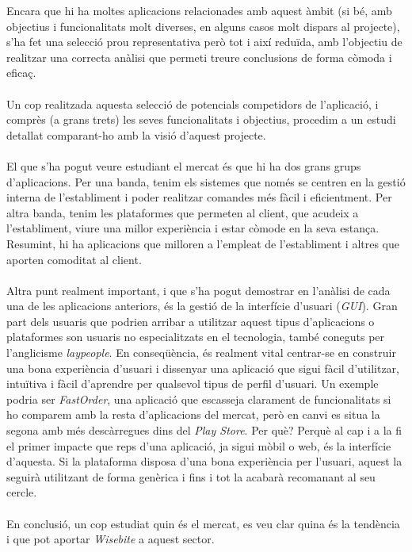 Encara que hi ha moltes aplicacions relacionades amb aquest àmbit (si bé, amb objectius i funcionalitats molt diverses, en alguns casos molt dispars al projecte), s'ha fet una selecció prou representativa però tot i així reduïda, amb l'objectiu de realitzar una correcta anàlisi que permeti treure conclusions de forma còmoda i eficaç.
\\\\
Un cop realitzada aquesta selecció de potencials competidors de l'aplicació, i comprès (a grans trets) les seves funcionalitats i objectius, procedim a un estudi detallat comparant-ho amb la visió d'aquest projecte.
\\\\
El que s'ha pogut veure estudiant el mercat és que hi ha dos grans grups d'aplicacions. Per una banda, tenim els sistemes que només se centren en la gestió interna de l'establiment i poder realitzar comandes més fàcil i eficientment. Per altra banda, tenim les plataformes que permeten al client, que acudeix a l'establiment, viure una millor experiència i estar còmode en la seva estança. Resumint, hi ha aplicacions que milloren a l'empleat de l'establiment i altres que aporten comoditat al client.
\\\\
Altra punt realment important, i que s'ha pogut demostrar en l'anàlisi de cada una de les aplicacions anteriors, és la gestió de la interfície d'usuari (\textit{GUI}). Gran part dels usuaris que podrien arribar a utilitzar aquest tipus d'aplicacions o plataformes son usuaris no especialitzats en el tecnologia, també coneguts per l'anglicisme \textit{laypeople}. En conseqüència, és realment vital centrar-se en construir una bona experiència d'usuari i dissenyar una aplicació que sigui fàcil d'utilitzar, intuïtiva i fàcil d'aprendre per qualsevol tipus de perfil d'usuari. Un exemple podria ser \textit{FastOrder}, una aplicació que escasseja clarament de funcionalitats si ho comparem amb la resta d'aplicacions del mercat, però en canvi es situa la segona amb més descàrregues dins del \textit{Play Store}. Per què? Perquè al cap i a la fi el primer impacte que reps d'una aplicació, ja sigui mòbil o web, és la interfície d'aquesta. Si la plataforma disposa d'una bona experiència per l'usuari, aquest la seguirà utilitzant de forma genèrica i fins i tot la acabarà recomanant al seu cercle.
\\\\
En conclusió, un cop estudiat quin és el mercat, es veu clar quina és la tendència i que pot aportar \textit{Wisebite} a aquest sector.
